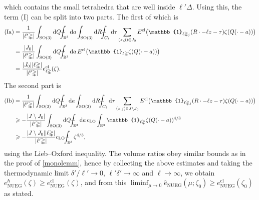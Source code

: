 \documentclass[final,onefignum,onetabnum,reqno]{amsart}
\theoremstyle{remark}
\renewcommand{\ge}{\geqslant}
\newcommand{\wh}[1]{\widehat{#1}}
\newcommand{\RR}{\mathbb{R}}
\newcommand{\SO}{\mathrm{SO}}
\newcommand{\cl}{\mathrm{cl}} %
\newcommand{\LO}{\mathrm{LO}} %
\newcommand{\NUEG}{\mathrm{NUEG}} %
\newcommand{\iden}{\mathbb{1}} %
\newcommand{\tetra}{\mathbb{\Delta}} %
\newcommand{\dd}{\mathrm{d}} %
\def\Xint#1{\mathchoice
{\XXint\displaystyle\textstyle{#1}}%
{\XXint\textstyle\scriptstyle{#1}}%
{\XXint\scriptstyle\scriptscriptstyle{#1}}%
{\XXint\scriptscriptstyle\scriptscriptstyle{#1}}%
\!\int}
\def\XXint#1#2#3{{\setbox0=\hbox{$#1{#2#3}{\int}$ }
\vcenter{\hbox{$#2#3$ }}\kern-.6\wd0}}
\def\dashint{\Xint-}
\begin{document}
which contains the small tetrahedra that are well inside $\ell'\tetra$. Using this, the term (I) can be split into two parts. The first of which is
\begin{align*}
\mathrm{(Ia)}&= \frac{1}{|\ell'\tetra|} \int_{\SO(3)}\dd Q\dashint_{\RR^3}\dd a \int_{\SO(3)}\dd R \dashint_{C_\ell}\dd\tau \sum_{(z,j)\in J_0} 
E^\cl\bigl(\iden_{\ell\tetra_j}(R\cdot-\ell z-\tau)\zeta(Q(\cdot-a))\bigr) \\
&=\frac{|J_0|}{|\ell'\tetra|} \int_{\SO(3)}\dd Q\dashint_{\RR^3}\dd a\,
E^\cl\bigl(\iden_{\ell\tetra}\zeta(Q(\cdot-a))\bigr) \\
&=\frac{|J_0||\ell\tetra|}{|\ell'\tetra|} e_{\ell\tetra}^\cl(\zeta).
\end{align*}
The second part is
\begin{align*}
\mathrm{(Ib)}&= \frac{1}{|\ell'\tetra|} \int_{\SO(3)}\dd Q\dashint_{\RR^3}\dd a \int_{\SO(3)}\dd R \dashint_{C_\ell}\dd\tau \sum_{(z,j)\in J\setminus J_0} 
E^\cl\bigl(\iden_{\ell\tetra_j}(R\cdot-\ell z-\tau)\zeta(Q(\cdot-a))\bigr) \\
&\ge - \frac{|J\setminus J_0|}{|\ell'\tetra|} \int_{\SO(3)}\dd Q\dashint_{\RR^3}\dd a\,
c_\LO \int_{\RR^3} \iden_{\ell\tetra}\zeta(Q(\cdot-a))^{4/3} \\
&\ge - \frac{|J\setminus J_0||\ell\tetra|}{|\ell'\tetra|} c_\LO \dashint_{\RR^3} \zeta^{4/3},
\end{align*}
using the Lieb--Oxford inequality. The volume ratios obey similar bounds as in the proof of \cref{monolemm}, hence by
collecting the above estimates and taking the thermodynamic limit $\delta'/\ell'\to 0$, $\ell'\delta'\to\infty$ and $\ell\to\infty$, we obtain
$e_\NUEG^\hbar(\zeta)\ge e_\NUEG^\cl(\zeta)$,
and from this
$\liminf_{\mu\to 0} \wh{e}_\NUEG(\mu;\zeta_0)\ge e_\NUEG^\cl(\zeta_0)$ as stated.


\appendix


\end{document}
